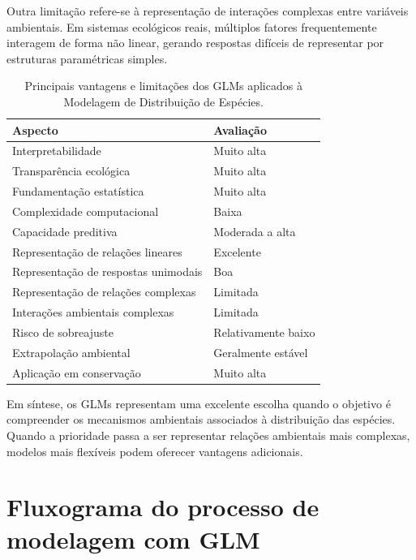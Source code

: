 Outra limitação refere-se à representação de interações complexas entre variáveis ambientais. Em sistemas ecológicos reais, múltiplos fatores frequentemente interagem de forma não linear, gerando respostas difíceis de representar por estruturas paramétricas simples.

\begin{table}[H]
	\centering
	\caption{Principais vantagens e limitações dos GLMs aplicados à Modelagem de Distribuição de Espécies.}
	\begin{tabular}{p{5cm} p{8cm}}
		\hline
		Aspecto & Avaliação \\
		\hline
		Interpretabilidade & Muito alta \\
		Transparência ecológica & Muito alta \\
		Fundamentação estatística & Muito alta \\
		Complexidade computacional & Baixa \\
		Capacidade preditiva & Moderada a alta \\
		Representação de relações lineares & Excelente \\
		Representação de respostas unimodais & Boa \\
		Representação de relações complexas & Limitada \\
		Interações ambientais complexas & Limitada \\
		Risco de sobreajuste & Relativamente baixo \\
		Extrapolação ambiental & Geralmente estável \\
		Aplicação em conservação & Muito alta \\
		\hline
	\end{tabular}
	\label{tab:glm_vantagens}
\end{table}

Em síntese, os GLMs representam uma excelente escolha quando o objetivo é compreender os mecanismos ambientais associados à distribuição das espécies. Quando a prioridade passa a ser representar relações ambientais mais complexas, modelos mais flexíveis podem oferecer vantagens adicionais.


\section{Fluxograma do processo de modelagem com GLM}

